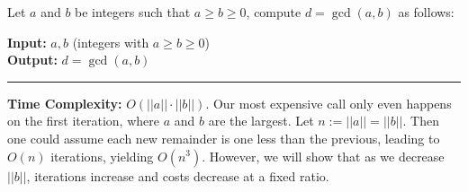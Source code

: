 \newpage

\begin{Func}

    \label{func:gcd}
    Let $a$ and $b$ be integers such that $a \geq b \geq 0$, compute $d = \gcd(a, b)$ as follows:

    \vspace{.5em}
    \noindent
    \textbf{Input:} $a, b$ (integers with $a \geq b \geq 0$)\\
    \textbf{Output:} $d = \gcd(a, b)$

    \vspace{.5em}
    \begin{algorithm}[H]
        \SetAlgoLined
    \end{algorithm}

    \noindent\rule{\textwidth}{0.4pt}

    \noindent
    \textbf{Time Complexity:} $O(||a|| \cdot ||b||)$. Our most expensive call only even happens 
    on the first iteration, where $a$ and $b$ are the largest. Let $n:=||a||=||b||.$ Then one could assume each new remainder is one less than the previous, leading to $O(n)$ iterations, yielding $O(n^3)$. However, we will show 
    that as we decrease $||b||$, iterations increase and costs decrease at a fixed ratio.
\end{Func}

